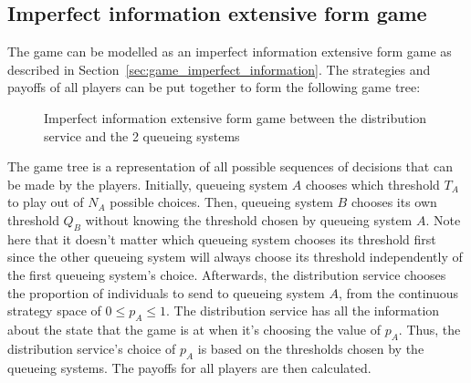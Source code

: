 \subsection{Imperfect information extensive form game}

The game can be modelled as an imperfect information extensive form game as
described in Section~\ref{sec:game_imperfect_information}.
The strategies and payoffs of all players can be put together to form the
following game tree:

\begin{figure}[H]
    \centering
    
    \caption{Imperfect information extensive form game between the distribution
    service and the 2 queueing systems}
    \label{fig:imperfect_info_game}
\end{figure}

The game tree is a representation of all possible sequences of decisions that
can be made by the players.
Initially, queueing system \(A\) chooses which threshold \(T_A\) to play out of
\(N_A\) possible choices.
Then, queueing system \(B\) chooses its own threshold \(Q_B\) without knowing
the threshold chosen by queueing system \(A\).
Note here that it doesn't matter which queueing system chooses its threshold
first since the other queueing system will always choose its threshold
independently of the first queueing system's choice.
Afterwards, the distribution service chooses the proportion of individuals to
send to queueing system \(A\), from the continuous strategy space of
\(0 \leq p_A \leq 1\).
The distribution service has all the information about the state that the game
is at when it's choosing the value of \(p_A\).
Thus, the distribution service's choice of \(p_A\) is based on the thresholds
chosen by the queueing systems.
The payoffs for all players are then calculated.